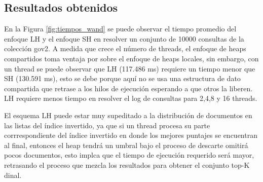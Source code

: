 \subsection{Resultados obtenidos}
\label{evaluacionexperimental:resultadosObtenidos}

En la Figura \ref{fig:tiempos_wand} se puede observar el tiempo promedio del enfoque LH y el enfoque SH en resolver un conjunto de 10000 consultas de la colección gov2. A medida que crece el número de threads, el enfoque de heaps compartidos toma ventaja por sobre el enfoque de heaps locales, sin embargo, con un thread se puede observar que LH (117.486 ms) requiere un tiempo menor que SH (130.591 ms), esto se debe porque aquí no se usa una estructura de dato compartida que retrase a los hilos de ejecución esperando a que otros la liberen. LH requiere menos tiempo en resolver el log de consultas para 2,4,8 y 16 threads. 

El esquema LH puede estar muy supeditado a la distribución de documentos en las listas del índice invertido, ya que si un thread procesa su parte corrrespondiente del índice invertido en donde los mejores puntajes se encuentran al final, entonces el heap tendrá un umbral bajo el proceso de descarte omitirá pocos documentos, esto implca que el tiempo de ejecución requerido será mayor, retrasando el proceso que mezcla los resultados para obtener el conjunto top-K dinal. 

